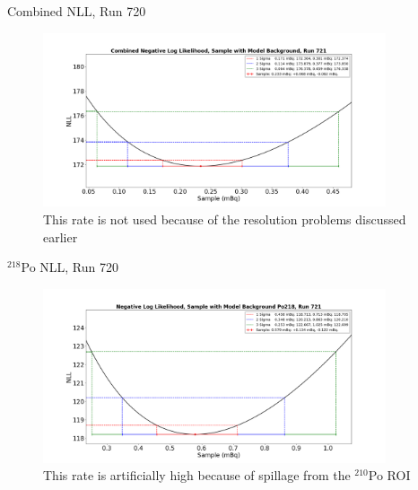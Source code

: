 \documentclass[aspectratio=169]{beamer}
\begin{document}
\begin{frame}{Combined NLL, Run 720}
    \begin{figure}
        \begin{center}
            \includegraphics[width=0.9\textwidth]
            {assets/720/comNLL.png}
            \caption{This rate is not used because of the resolution problems discussed earlier}
        \end{center}
    \end{figure}
\end{frame}

\begin{frame}{$^{218}$Po NLL, Run 720}
    \begin{figure}
        \begin{center}
            \includegraphics[width=0.9\textwidth]
            {assets/720/NLL218.png}
            \caption{This rate is artificially high because of spillage from the $^{210}$Po ROI}
        \end{center}
    \end{figure}
\end{frame}
\end{document}
